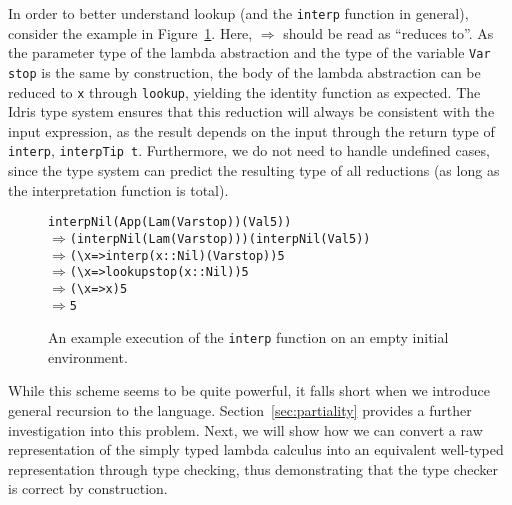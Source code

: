 In order to better understand lookup (and the \texttt{interp} function in general), consider the example in Figure~\ref{fig:well-typed-interpreter-example}. Here, $\Rightarrow$ should be read as ``reduces to''. As the parameter type of the lambda abstraction and the type of the variable \texttt{Var stop} is the same by construction, the body of the lambda abstraction can be reduced to \texttt{x} through \texttt{lookup}, yielding the identity function as expected. The Idris type system ensures that this reduction will always be consistent with the input expression, as the result depends on the input through the return type of \texttt{interp}, \texttt{interpTip t}. Furthermore, we do not need to handle undefined cases, since the type system can predict the resulting type of all reductions (as long as the interpretation function is total).

\begin{figure}
\begin{alltt}
interp Nil (App (Lam (Var stop)) (Val 5))
\(\Rightarrow\) (interp Nil (Lam (Var stop))) (interp Nil (Val 5))
\(\Rightarrow\) (\textbackslash{x} => interp (x :: Nil) (Var stop)) 5
\(\Rightarrow\) (\textbackslash{x} => lookup stop (x :: Nil)) 5
\(\Rightarrow\) (\textbackslash{x} => x) 5
\(\Rightarrow\) 5
\end{alltt}
\caption{An example execution of the \texttt{interp} function on an empty initial environment.}
\label{fig:well-typed-interpreter-example}
\end{figure}

While this scheme seems to be quite powerful, it falls short when we introduce general recursion to the language. Section~\ref{sec:partiality} provides a further investigation into this problem. Next, we will show how we can convert a raw representation of the simply typed lambda calculus into an equivalent well-typed representation through type checking, thus demonstrating that the type checker is correct by construction.
